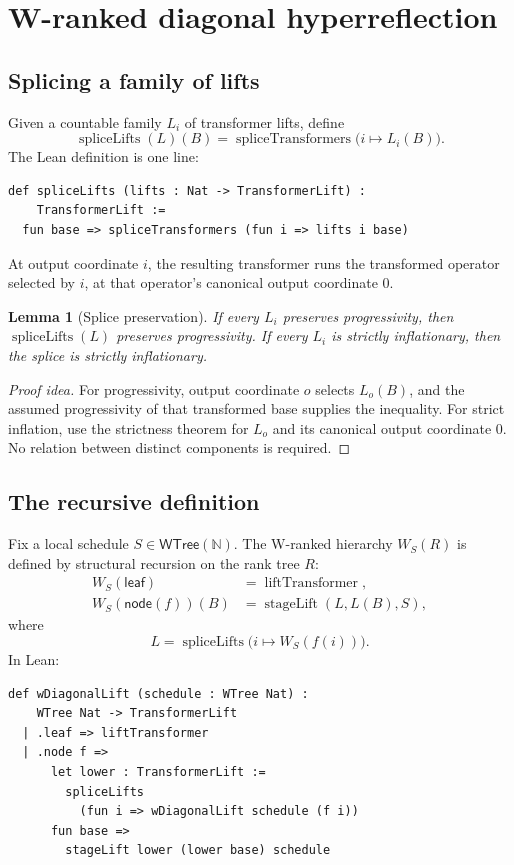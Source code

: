 \documentclass[11pt]{article}
\newtheorem{lemma}[theorem]{Lemma}
\theoremstyle{definition}
\newcommand{\Nat}{\mathbb{N}}
\newcommand{\WTree}{\mathsf{WTree}(\Nat)}
\begin{document}
\section{W-ranked diagonal hyperreflection}

\subsection{Splicing a family of lifts}

Given a countable family \(L_i\) of transformer lifts, define
\[
  \operatorname{spliceLifts}(L)(B)
  = \operatorname{spliceTransformers}\bigl(i\mapsto L_i(B)\bigr).
\]
The Lean definition is one line:
\begin{lstlisting}
def spliceLifts (lifts : Nat -> TransformerLift) :
    TransformerLift :=
  fun base => spliceTransformers (fun i => lifts i base)
\end{lstlisting}
At output coordinate \(i\), the resulting transformer runs the transformed
operator selected by \(i\), at that operator's canonical output coordinate
\(0\).

\begin{lemma}[Splice preservation]
If every \(L_i\) preserves progressivity, then
\(\operatorname{spliceLifts}(L)\) preserves progressivity.  If every \(L_i\)
is strictly inflationary, then the splice is strictly inflationary.
\end{lemma}

\begin{proof}[Proof idea]
For progressivity, output coordinate \(o\) selects \(L_o(B)\), and the assumed
progressivity of that transformed base supplies the inequality.  For strict
inflation, use the strictness theorem for \(L_o\) and its canonical output
coordinate \(0\).  No relation between distinct components is required.
\end{proof}

\subsection{The recursive definition}

Fix a local schedule \(S\in\WTree\).  The W-ranked hierarchy
\(W_S(R)\) is defined by structural recursion on the rank tree \(R\):
\begin{align*}
  W_S(\mathsf{leaf})
    &= \operatorname{liftTransformer},\\
  W_S(\mathsf{node}(f))(B)
    &= \operatorname{stageLift}(L,L(B),S),
\end{align*}
where
\[
  L=\operatorname{spliceLifts}\bigl(i\mapsto W_S(f(i))\bigr).
\]
In Lean:
\begin{lstlisting}
def wDiagonalLift (schedule : WTree Nat) :
    WTree Nat -> TransformerLift
  | .leaf => liftTransformer
  | .node f =>
      let lower : TransformerLift :=
        spliceLifts
          (fun i => wDiagonalLift schedule (f i))
      fun base =>
        stageLift lower (lower base) schedule
\end{lstlisting}
\end{document}
